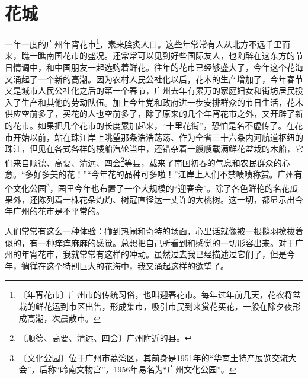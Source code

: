 \documentclass[12pt,UTF-8,openany]{ctexbook}
\begin{document}
\chapter{花城}

\begin{normalsize}
    
    一年一度的广州年宵花市\footnote{〔年宵花市〕广州市的传统习俗，也叫迎春花市。每年过年前几天，花农将盆栽的鲜花运到市区出售，形成集市，吸引市民到来赏花买花，一般在除夕夜形成高潮，次晨散市。}，素来脍炙人口。这些年常常有人从北方不远千里而来，瞧一瞧南国花市的盛况。还常常可以见到好些国际友人，也陶醉在这东方的节日情调中，和中国朋友一起选购着鲜花。往年的花市已经够盛大了，今年这个花海又涌起了一个新的高潮。因为农村人民公社化以后，花木的生产增加了，今年春节又是城市人民公社化之后的第一个春节，广州去年有累万的家庭妇女和街坊居民投入了生产和其他的劳动队伍。加上今年党和政府进一步安排群众的节日生活，花木供应空前多了，买花的人也空前多了，除了原来的几个年宵花市之外，又开辟了新的花市。如果把几个花市的长度累加起来，“十里花街”，恐怕是名不虚传了。在花市开始以前，站在珠江岸上眺望那条浩浩荡荡、作为全省三十六条内河航道枢纽的珠江，但见在各式各样的楼船汽轮当中，还错杂着一艘艘载满鲜花盆栽的木船，它们来自顺德、高要、清远、四会\footnote{〔顺德、高要、清远、四会〕广州附近的县。}等县，载来了南国初春的气息和农民群众的心意。“多好多美的花！”“今年花的品种可多啦！”江岸上人们不禁啧啧称赏。广州有个文化公园\footnote{〔文化公园〕位于广州市荔湾区，其前身是1951年的“华南土特产展览交流大会”，后称“岭南文物宫”，1956年易名为“广州文化公园”。}，园里今年也布置了一个大规模的“迎春会”。除了各色鲜艳的名花瓜果外，还陈列着一株花朵灼灼、树冠直径达一丈许的大桃树。这一切，都显示出今年广州的花市是不平常的。
    
    人们常常有这么一种体验：碰到热闹和奇特的场面，心里话就像被一根鹅羽撩拔着似的，有一种痒痒麻麻的感觉。总想把自己所看到和感觉的一切形容出来。对于广州的年宵花市，我就常常有这样的冲动。虽然过去我已经描述过它们了，但是今年，徜徉在这个特别巨大的花海中，我又涌起这样的欲望了。
    

\end{normalsize}
\end{document}
